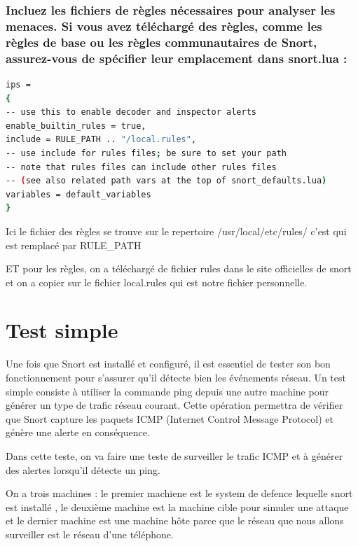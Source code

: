 \documentclass[12pt]{article}
\begin{document}
\subsubsection{Incluez les fichiers de règles nécessaires pour analyser les menaces. Si vous avez téléchargé des règles, comme les règles de base ou les règles communautaires de Snort, assurez-vous de spécifier leur emplacement dans snort.lua :}

\begin{lstlisting}[language=bash]
ips =
{
-- use this to enable decoder and inspector alerts
enable_builtin_rules = true,
include = RULE_PATH .. "/local.rules",
-- use include for rules files; be sure to set your path
-- note that rules files can include other rules files
-- (see also related path vars at the top of snort_defaults.lua)
variables = default_variables
}
\end{lstlisting}

Ici le fichier des règles se trouve sur le repertoire /usr/local/etc/rules/ c'est qui est remplacé par RULE\_PATH

ET pour les règles, on a téléchargé de fichier rules dans le site officielles de snort et on a copier sur le fichier local.rules qui est notre fichier personnelle.
\section{Test simple}
Une fois que Snort est installé et configuré, il est essentiel de tester son bon fonctionnement pour s’assurer qu’il détecte bien les événements réseau. Un test simple consiste à utiliser la commande ping depuis une autre machine pour générer un type de trafic réseau courant. Cette opération permettra de vérifier que Snort capture les paquets ICMP (Internet Control Message Protocol) et génère une alerte en conséquence.

Dans cette teste, on va faire une teste  de surveiller le trafic ICMP et à générer des alertes lorsqu’il détecte un ping.

On a trois machines : le premier machiene est le system de defence lequelle snort est installé , le deuxième machine est la machine cible pour simuler une attaque et le dernier machine est une machine hôte parce que le réseau que nous allons surveiller est le réseau d'une téléphone.
\end{document}
